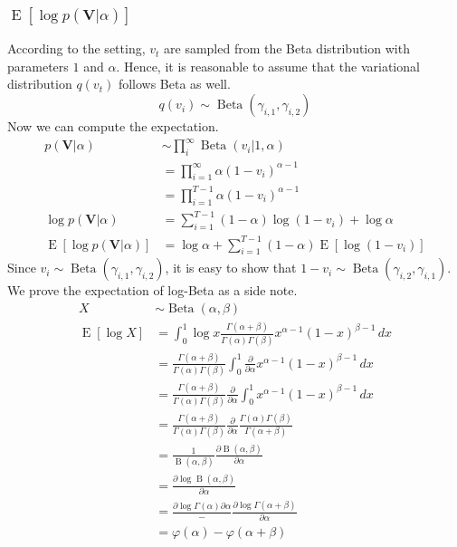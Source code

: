 \documentclass[11pt]{article}
\newcommand{\bs}{\boldsymbol}
\newcommand{\opn}{\operatorname}
\begin{document}
\subsubsection{$\opn{E}\left[\log p\left(\bs{V}|\alpha \right) \right] $}
According to the setting, $v_{t}$ are sampled from the Beta distribution with parameters $1$ and $\alpha$. Hence, it is reasonable to assume that the variational distribution $q\left(v_{t} \right)$ follows Beta as well.
$$
  q\left(v_{i} \right) \sim \opn{Beta} \left(\gamma_{i,1}, \gamma_{i,2} \right)
$$
Now we can compute the expectation.
\begin{align*}
  p\left(\bs{V}|\alpha \right) &\sim \prod_{i}^{\infty} \opn{Beta}\left(v_{i}|1, \alpha \right)\\
  &= \prod_{i=1}^{\infty} \alpha \left(1-v_{i} \right)^{\alpha -1}\\
  &= \prod_{i=1}^{T-1} \alpha \left(1-v_{i} \right)^{\alpha-1}\\
  \log p\left(\bs{V}|\alpha \right) &= \sum_{i=1}^{T-1} \left(1-\alpha \right)\log \left(1-v_{i} \right) + \log \alpha\\
  \opn{E}\left[\log p \left(\bs{V}|\alpha \right) \right] &= \log \alpha + \sum_{i=1}^{T-1} \left(1-\alpha \right) \opn{E}\left[\log \left(1-v_{i} \right) \right]
\end{align*}
Since $v_{i} \sim \opn{Beta} \left(\gamma_{i,1}, \gamma_{i,2} \right)$, it is easy to show that $1-v_{i} \sim \opn{Beta} \left(\gamma_{i,2}, \gamma_{i,1} \right)$. We prove the expectation of log-Beta as a side note.
\begin{align*}
  X &\sim \opn{Beta}\left(\alpha, \beta \right)\\
  \opn{E}\left[\log X \right] &= \int_{0}^{1} \log x \frac{\Gamma\left(\alpha + \beta \right)}{\Gamma\left(\alpha \right)\Gamma\left(\beta\right)} x^{\alpha-1}\left(1-x\right)^{\beta-1} \, dx\\
  &= \frac{\Gamma\left(\alpha + \beta \right)}{\Gamma\left(\alpha \right)\Gamma\left(\beta\right)} \int_{0}^{1} \frac{\partial}{\partial \alpha} x^{\alpha-1}\left(1-x\right)^{\beta-1} \, dx \\
  &= \frac{\Gamma\left(\alpha + \beta \right)}{\Gamma\left(\alpha \right)\Gamma\left(\beta\right)} \frac{\partial}{\partial \alpha}\int_{0}^{1} x^{\alpha-1}\left(1-x\right)^{\beta-1} \, dx \\
  &= \frac{\Gamma\left(\alpha + \beta \right)}{\Gamma\left(\alpha \right)\Gamma\left(\beta\right)} \frac{\partial}{\partial \alpha} \frac{\Gamma\left(\alpha\right)\Gamma\left(\beta\right)}{\Gamma\left(\alpha+\beta\right)}\\
  &= \frac{1}{\opn{B}\left(\alpha, \beta \right)} \frac{\partial \opn{B}\left(\alpha, \beta \right)}{\partial \alpha}\\
  &= \frac{\partial \log \opn{B}\left(\alpha, \beta\right)}{\partial \alpha}\\
  &= \frac{\partial \log \Gamma\left(\alpha\right){\partial \alpha}} - \frac{\partial \log \Gamma \left(\alpha+\beta \right)}{\partial \alpha}\\
  &= \varphi \left(\alpha \right) - \varphi \left( \alpha + \beta \right)
\end{align*}
\end{document}
